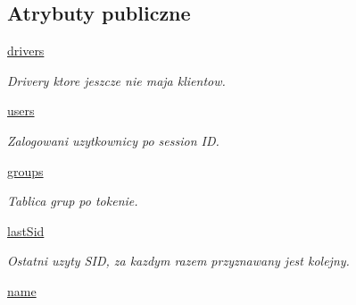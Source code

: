 \subsection*{Atrybuty publiczne}
\begin{CompactItemize}
\item 
\hyperlink{class_serv_1_1_user_group_manager_1_1_user_group_manager_00aa453d586337ce2692166c666a1817}{drivers}
\begin{CompactList}\small\item\em Drivery ktore jeszcze nie maja klientow. \item\end{CompactList}\item 
\hypertarget{class_serv_1_1_user_group_manager_1_1_user_group_manager_b41620628a204c943cd30a8f836eddd0}{
\hyperlink{class_serv_1_1_user_group_manager_1_1_user_group_manager_b41620628a204c943cd30a8f836eddd0}{users}}
\label{class_serv_1_1_user_group_manager_1_1_user_group_manager_b41620628a204c943cd30a8f836eddd0}

\begin{CompactList}\small\item\em Zalogowani uzytkownicy po session ID. \item\end{CompactList}\item 
\hypertarget{class_serv_1_1_user_group_manager_1_1_user_group_manager_4da728a66a4115432bdc2057fd3e92fa}{
\hyperlink{class_serv_1_1_user_group_manager_1_1_user_group_manager_4da728a66a4115432bdc2057fd3e92fa}{groups}}
\label{class_serv_1_1_user_group_manager_1_1_user_group_manager_4da728a66a4115432bdc2057fd3e92fa}

\begin{CompactList}\small\item\em Tablica grup po tokenie. \item\end{CompactList}\item 
\hypertarget{class_serv_1_1_user_group_manager_1_1_user_group_manager_97c7d967f8ebfe883963ff38bee5ecaf}{
\hyperlink{class_serv_1_1_user_group_manager_1_1_user_group_manager_97c7d967f8ebfe883963ff38bee5ecaf}{lastSid}}
\label{class_serv_1_1_user_group_manager_1_1_user_group_manager_97c7d967f8ebfe883963ff38bee5ecaf}

\begin{CompactList}\small\item\em Ostatni uzyty SID, za kazdym razem przyznawany jest kolejny. \item\end{CompactList}\item 
\hypertarget{class_serv_1_1_user_group_manager_1_1_user_group_manager_c2e922b108e77474d9daab6be8055436}{
\hyperlink{class_serv_1_1_user_group_manager_1_1_user_group_manager_c2e922b108e77474d9daab6be8055436}{name}}
\label{class_serv_1_1_user_group_manager_1_1_user_group_manager_c2e922b108e77474d9daab6be8055436}


\end{CompactItemize}

